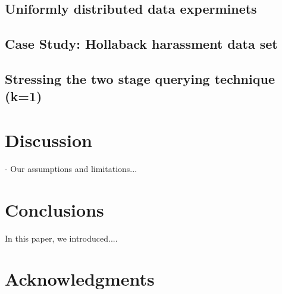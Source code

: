 \documentclass{acm_proc_article-sp}
\begin{document}
\subsection{Uniformly distributed data experminets}
\subsection{Case Study: Hollaback harassment data set}
\subsection{Stressing the two stage querying technique (k=1)}

\section{Discussion}
- Our assumptions and limitations...

\section{Conclusions}
In this paper, we introduced.... 

\section{Acknowledgments}


{\footnotesize
}  %
%
%
\end{document}
